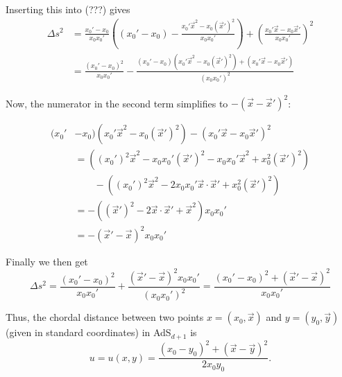 Inserting this into (???) gives
\begin{equation}\begin{split}
\Delta{s}^2 &= \frac{x_{0}' - x_{0}}{x_{0}x_{0}'}\left((x_{0}'-x_{0})-\frac{x_{0}' \vec{x}^2 - x_{0} (\vec{x}')^2}{x_{0}x_{0}'}\right) + \left(\frac{x_{0}' \vec{x} - x_{0} \vec{x}'}{x_{0}x_{0}'}\right)^2\\
&=\frac{(x_{0}' - x_{0})^2}{x_{0}x_{0}'}-\frac{(x_{0}'-x_{0})(x_{0}' \vec{x}^2 - x_{0} (\vec{x}')^2)+(x_{0}' \vec{x} - x_{0} \vec{x}')}{(x_{0}x_{0}')^2}
\end{split}\end{equation}

Now, the numerator in the second term simplifies to $-(\vec{x}-\vec{x}')^2$:

\begin{equation}\begin{split}
(x_{0}' &- x_{0})(x_{0}' \vec{x}^2 - x_{0} (\vec{x}')^2) - (x_{0}' \vec{x} - x_{0} \vec{x}')^2\\
&= ((x_{0}')^2 \vec{x}^2 - x_{0}x_{0}' (\vec{x}')^2  - x_{0}x_{0}' \vec{x}^2 + x_{0}^2 (\vec{x}')^2) \\
& \qquad - ((x_{0}')^2 \vec{x}^2 - 2 x_{0}x_{0}' \vec{x}\cdot\vec{x}' + x_{0}^2 (\vec{x}')^2)\\
&= -((\vec{x}')^2 - 2 \vec{x}\cdot\vec{x}' + \vec{x}^2)x_{0}x_{0}' \\
&= -(\vec{x}' - \vec{x})^2 x_{0}x_{0}'
\end{split}\end{equation}

Finally we then get
$$\Delta{s}^2 = \frac{(x_{0}' - x_{0})^2}{x_{0}x_{0}'} + \frac{(\vec{x}' - \vec{x})^2 x_{0}x_{0}'}{(x_{0}x_{0}')^2} = \frac{(x_{0}' - x_{0})^2 + (\vec{x}' - \vec{x})^2}{x_{0}x_{0}'}$$

Thus, the chordal distance between two points $x=(x_0,\vec{x})$ and $y=(y_0,\vec{y})$ (given in standard coordinates) in AdS$_{d+1}$ is
$$u = u(x,y) = \frac{(x_0 - y_0)^2 + (\vec{x} - \vec{y})^2}{2 x_0 y_0}.$$


